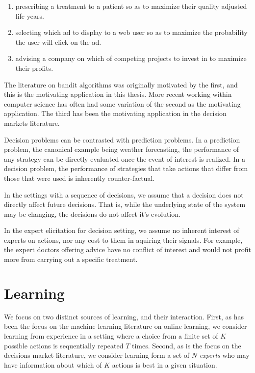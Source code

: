 \begin{enumerate}
	\item  prescribing a treatment to a patient so as to maximize their quality adjusted life years.
	\item selecting which ad to display to a web user so as to maximize the probability the user will click on the ad.
	\item advising a company on which of competing projects to invest in to maximize their profits.
\end{enumerate}

The literature on bandit algorithms was originally motivated by the first, and this is the motivating application in this thesis. More recent working within computer science has often had some variation of the second as the motivating application. The third has been the motivating application in the decision markets literature.

Decision problems can be contrasted with prediction problems.
In a prediction problem, the canonical example being weather forecasting, the performance of any strategy can be directly evaluated once the event of interest is realized.
In a decision problem, the performance of strategies that take actions that differ from those that were used is inherently counter-factual.

In the settings with a sequence of decisions,  we assume that a decision does not directly affect  future decisions. That is, while the underlying state of the system may be changing, the decisions do not affect it's evolution.

In the expert elicitation for decision setting, we assume no inherent interest of experts on actions, nor any cost to them in aquiring their signals.
For example, the expert doctors offering advice have no conflict of interest and would not profit more from carrying out a specific treatment.


\section{Learning}

We focus on two distinct sources of learning, and their interaction.
First, as has been the focus on the machine learning literature on online learning, we consider learning from experience in a setting where a choice from a finite set of $K$ possible actions is sequentially repeated $T$ times.
Second, as is the focus on the decisions market literature, we consider learning form a set of $N$ \emph{experts} who may have information about which of $K$ actions is best in a given situation.

